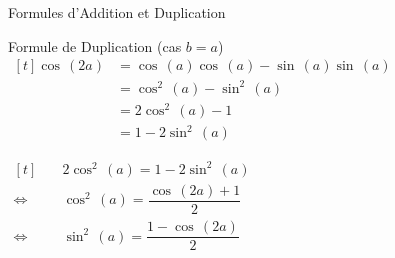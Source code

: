 \documentclass{coursbook}
\begin{document}
\begin{Gpartie}{Formules d'Addition et Duplication}
\begin{Spartie}{Formule de Duplication (cas $b=a$)}
            $\begin{aligned}[t]
                \cos\,(2a) &= \cos\,(a)\cos\,(a)-\sin\,(a)\sin\,(a) \\
                &=\cos^2\,(a)-\sin^2\,(a) \\
                &= 2\cos^2\,(a)-1 \\ 
                &= 1-2\sin^2\,(a)
            \end{aligned}$

            $\begin{aligned}[t]
                &\quad2\cos^2\,(a)=1-2\sin^2\,(a) \\
                \iff&\quad\cos^2\,(a)=\dfrac{\cos\,(2a)+1}{2} \\
                \iff&\quad\sin^2\,(a)=\dfrac{1-\cos\,(2a)}{2}
            \end{aligned}$
        \end{Spartie}
    \end{Gpartie}
    \pagebreak
\end{document}
